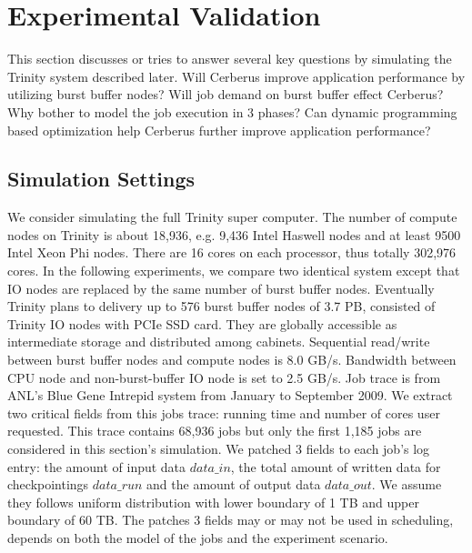 \section{Experimental Validation}
\label{Sec:Experiments}

This section discusses or tries to answer several key questions by
simulating the Trinity system described later.
Will Cerberus improve application performance by utilizing burst buffer nodes?
Will job demand on burst buffer effect Cerberus?
Why bother to model the job execution in 3 phases?
Can dynamic programming based optimization help Cerberus further
improve application performance?

\subsection{Simulation Settings}
We consider simulating the full Trinity super computer\cite{TrinitySystem}.
The number of compute nodes on Trinity is about 18,936,
e.g. 9,436 Intel Haswell nodes
and at least 9500 Intel Xeon Phi nodes.
There are 16 cores on each processor, thus totally 302,976 cores.
In the following experiments, we compare two identical system except that
IO nodes are replaced by the same number of burst buffer nodes.
Eventually Trinity plans to delivery up to 576 burst buffer nodes of 3.7 PB,
consisted of Trinity IO nodes with PCIe SSD card.
They are globally accessible as intermediate storage and distributed among cabinets.
Sequential read/write between burst buffer nodes and compute nodes is 8.0 GB/s.
Bandwidth between CPU node and non-burst-buffer IO node is set to 2.5 GB/s.
Job trace is from ANL's Blue Gene Intrepid system
from January to September 2009\cite{JobTrace}.
We extract two critical fields from this jobs trace: running time and
number of cores user requested.
This trace contains 68,936 jobs but
only the first 1,185 jobs are considered in this section's simulation.
We patched 3 fields to each job's log entry: the amount of input data $data\_in$,
the total amount of written data for checkpointings $data\_run$
and the amount of output data $data\_out$.
We assume they follows uniform distribution with
lower boundary of 1 TB and upper boundary of 60 TB.
The patches 3 fields may or may not be used in scheduling,
depends on both the model of the jobs and the experiment scenario.


